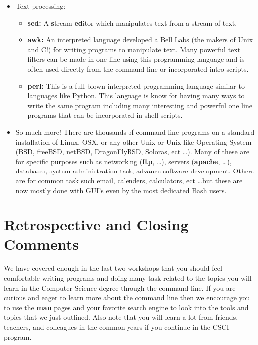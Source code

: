 \documentclass[oneside]{book}
\begin{document}
\begin{itemize}
        \item Text processing:
            \begin{itemize}
                \item{\textbf{sed:} } A \textbf{s}tream \textbf{ed}itor which manipulates text from a stream of text.  
                \item{\textbf{awk:}} An interpreted language developed a Bell Labs (the makers of Unix and C!) for writing programs to manipulate text. Many powerful text filters can be made in one line using this programming language and is often used directly from the command line or incorporated intro scripts.
                \item{\textbf{perl:}} This is a full blown interpreted programming language similar to languages like Python. This language is know for having many ways to write the same program including many interesting and powerful one line programs that can be incorporated in shell scripts.  
            \end{itemize}
        \item{So much more!} There are thousands of command line programs on a standard installation of Linux, OSX, or any other Unix or Unix like Operating System (BSD, freeBSD, netBSD, DragonFlyBSD, Soloras, ect \dots). Many of these are for specific purposes such as networking (\textbf{ftp}, \dots), servers (\textbf{apache}, \dots), databases, system administration task, advance software development. Others are for common task such email, calenders, calculators, ect \dots but these are now mostly done with GUI's even by the most dedicated Bash users. 
\end{itemize}

\section{Retrospective and Closing Comments}

We have covered enough in the last two workshops that you should feel comfortable writing programs and doing many task related to the topics you will learn in the Computer Science degree through the command line. If you are curious and eager to learn more about the command line then we encourage you to use the \textbf{man} pages and your favorite search engine to look into the tools and topics that we just outlined. Also note that you will learn a lot from friends, teachers, and colleagues in the common years if you continue in the CSCI program. 

\newpage
\end{document}

